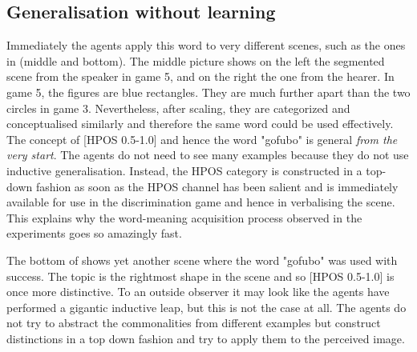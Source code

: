 \subsection{Generalisation without learning}

Immediately the agents apply this word to very 
different scenes, such as the ones in  (middle and bottom). The middle picture
shows on the left the segmented scene
from the speaker in game 5, and on the right the one
from the hearer. In game 5, the figures are blue
rectangles. They are much further apart than 
the two circles in game 3. Nevertheless, 
after scaling, they are categorized and
conceptualised similarly and therefore
the same word could be used effectively. The concept 
of [HPOS 0.5-1.0] and hence the word "gofubo" 
is general {\itshape from the very start}. 
The agents do not need to see many examples because they do 
not use inductive generalisation. Instead, 
the HPOS category is constructed in a top-down fashion 
as soon as the HPOS channel has been salient
and is immediately available for use in the 
discrimination game and hence in verbalising 
the scene. This explains why the word-meaning acquisition
process observed in the experiments goes so 
amazingly fast.

The bottom of 
shows yet another scene where the word "gofubo" 
was used with success. The topic is the rightmost
shape in the scene and so [HPOS 0.5-1.0] is once more 
distinctive. To an outside observer it may look 
like the agents have performed a gigantic inductive
leap, but this is not the case at all. The agents
do not try to abstract the commonalities from 
different examples but construct distinctions in a top 
down fashion and try to apply them to the perceived image. 

